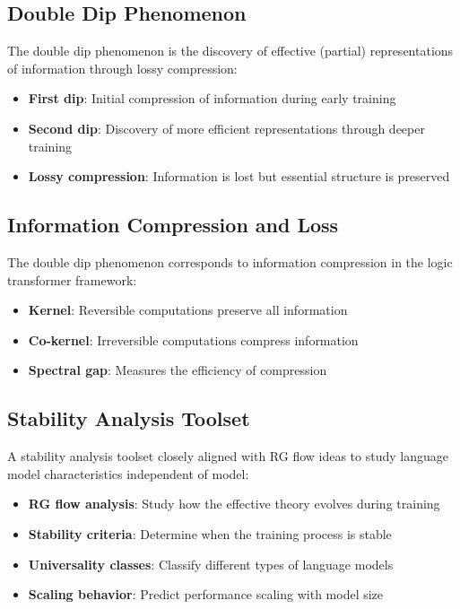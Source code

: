\subsection{Double Dip Phenomenon}

\begin{definition}
\label{def:double-dip}
The double dip phenomenon is the discovery of effective (partial) representations of information through lossy compression:
\begin{itemize}
\item \textbf{First dip}: Initial compression of information during early training
\item \textbf{Second dip}: Discovery of more efficient representations through deeper training
\item \textbf{Lossy compression}: Information is lost but essential structure is preserved
\end{itemize}
\end{definition}

\subsection{Information Compression and Loss}

\begin{theorem}
\label{thm:information-compression}
The double dip phenomenon corresponds to information compression in the logic transformer framework:
\begin{itemize}
\item \textbf{Kernel}: Reversible computations preserve all information
\item \textbf{Co-kernel}: Irreversible computations compress information
\item \textbf{Spectral gap}: Measures the efficiency of compression
\end{itemize}
\end{theorem}

\subsection{Stability Analysis Toolset}

\begin{definition}
\label{def:stability-toolset}
A stability analysis toolset closely aligned with RG flow ideas to study language model characteristics independent of model:
\begin{itemize}
\item \textbf{RG flow analysis}: Study how the effective theory evolves during training
\item \textbf{Stability criteria}: Determine when the training process is stable
\item \textbf{Universality classes}: Classify different types of language models
\item \textbf{Scaling behavior}: Predict performance scaling with model size
\end{itemize}
\end{definition}

